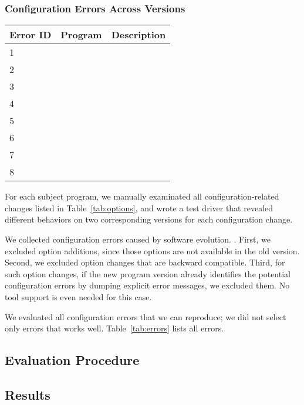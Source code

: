 \subsubsection{Configuration Errors Across Versions}

\begin{table}[t]
\vspace{1mm}
\centering
\small{
\setlength{\tabcolsep}{.80\tabcolsep}
\begin{tabular}{|l||c|c|}
\hline
 Error ID& Program & Description\\
 \hline
 \hline
 1 &  &  \\
 2 &  &  \\
 3 &  &  \\
 4 &  &  \\
 5 &  &  \\
 6 &  &  \\
 7 &  &  \\
 8 &  &  \\
\hline
\hline
\end{tabular}
}
\vspace{-2mm}
\end{table}



For each subject program, we manually examinated all
configuration-related changes listed in Table~\ref{tab:options},
and wrote a test driver that revealed different
behaviors on two corresponding versions for each configuration change.

We collected \errornum configuration errors caused by
software evolution. . First, we excluded option additions, since
those options are not available in the old version.
Second, we excluded option changes that are backward
compatible. Third, for such option changes, if the
new program version already identifies the potential
configuration errors by dumping explicit error messages,
we excluded them. No tool support is even needed
for this case.

We evaluated all configuration errors that we can reproduce;
we did not select only errors that \ourtool works well.
Table~\ref{tab:errors} lists all errors.

\subsection{Evaluation Procedure}

\subsection{Results}

